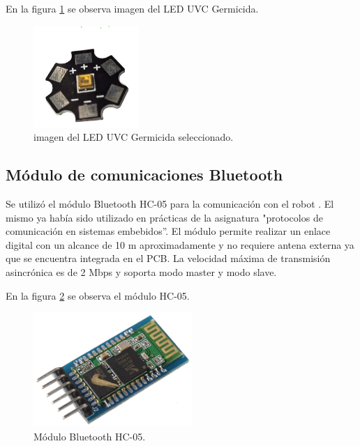 En la figura \ref{fig:leduvc} se observa imagen del LED UVC Germicida.

\begin{figure}[h]
	\centering
	\includegraphics[width=4cm]{./Figures/leduvc.PNG}
	\caption{imagen del LED UVC Germicida seleccionado\protect\footnotemark.}
	\label{fig:leduvc}
\end{figure}

\subsection{Módulo de comunicaciones Bluetooth}


Se utilizó el módulo Bluetooth HC-05 para la comunicación con el robot \citep{HC05}. El mismo ya había sido utilizado en  prácticas de la asignatura "protocolos de comunicación en sistemas embebidos”.
El módulo permite realizar un enlace digital con un alcance de 10 m aproximadamente y no requiere antena externa ya que se encuentra integrada en el PCB. La velocidad máxima de transmisión asincrónica es de 2 Mbps y soporta modo master y modo slave.

En la figura \ref{fig:moduloHC05} se observa el módulo HC-05.


\begin{figure}[h]
	\centering
	\includegraphics[width=6cm]{./Figures/HC05.jpeg}
	\caption{Módulo Bluetooth HC-05\protect\footnotemark.}
	\label{fig:moduloHC05}
\end{figure}


